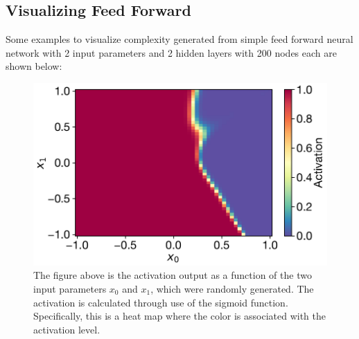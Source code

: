 \subsection{Visualizing Feed Forward}
Some examples to visualize complexity generated from simple feed forward neural network with 2 input parameters and 2 hidden layers with 200 nodes each are shown below:

\begin{figure}[H]
\centering
\includegraphics[scale=0.65]{../figures/output_activation.pdf}
\caption{The figure above is the activation output as a function of the two input parameters $x_0$ and $x_1$, which were randomly generated. The activation is calculated through use of the sigmoid function. Specifically, this is a heat map where the color is associated with the activation level.}
\end{figure}

